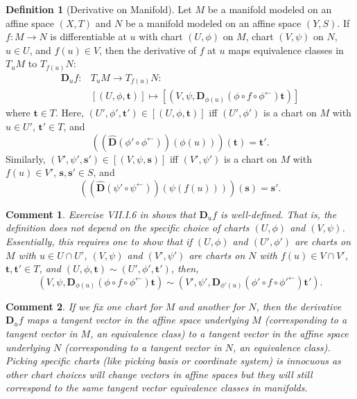 \documentclass[letterpaper,12pt]{article}
\theoremstyle{plain}
\theoremstyle{plain}
\newtheorem*{cmnt*}{Comment}
\theoremstyle{definition}
\newtheorem{defn}{Definition}
\begin{document}
\begin{defn}[Derivative on Manifold]\label{defmderiv}
Let $M$ be a manifold  modeled on an affine space $(X,T)$ and $N$ be a manifold  modeled on an affine space $(Y,S)$. If $f:M\rightarrow N$ is differentiable at $u$ with chart $(U,\phi)$ on $M$, chart $(V,\psi)$ on $N$, $u\in U$, and $f(u)\in V$, then the derivative of $f$ at $u$ maps equivalence classes in $T_uM$ to $T_{f(u)}N$:
\begin{align*}
\mathbf{D}_uf:&T_uM\rightarrow T_{f(u)}N:\\
&[(U,\phi,\mathbf{t})]\mapsto [\left(V,\psi,\mathbf{D}_{\phi(u)}\left(\phi\circ f \circ \phi^{\leftarrow}\right)\mathbf{t}\right)]
\end{align*}
where $\mathbf{t}\in T$. Here, $(U',\phi',\mathbf{t}')\in[(U,\phi,\mathbf{t})]$ iff $(U',\phi')$ is a chart on $M$ with $u\in U'$, $\mathbf{t}'\in T$,  and
\[ \left(\left(\hat{\mathbf{D}}\left(\phi' \circ \phi^{\leftarrow}\right)\right)\left(\phi(u)\right)\right)(\mathbf{t}) = \mathbf{t}'. \]
Similarly, $(V',\psi',\mathbf{s}')\in[(V,\psi,\mathbf{s})]$ iff $(V',\psi')$ is a chart on $M$ with $f(u)\in V'$, $\mathbf{s},\mathbf{s}'\in S$, and
\[ \left(\left(\hat{\mathbf{D}}\left(\psi' \circ \psi^{\leftarrow}\right)\right)\left(\psi(f(u))\right)\right)(\mathbf{s}) = \mathbf{s}'. \]
\end{defn}

\begin{cmnt*}
Exercise VII.I.6 in \citep{Dodson/Poston:1991} shows that $\mathbf{D}_uf$ is well-defined. That is, the definition does not depend on the specific choice of charts $(U,\phi)$ and $(V,\psi)$. Essentially, this requires one to show that if $(U,\phi)$ and $(U',\phi')$ are charts on $M$ with $u\in U\cap U'$, $(V,\psi)$ and $(V',\psi')$ are charts on $N$ with $f(u)\in V\cap V'$, $\mathbf{t},\mathbf{t}'\in T$, and $(U,\phi,\mathbf{t})\sim(U',\phi',\mathbf{t}')$, then,
\[ \left(V,\psi,\mathbf{D}_{\phi(u)}\left(\phi\circ f \circ \phi^{\leftarrow}\right)\mathbf{t}\right) \sim \left(V',\psi',\mathbf{D}_{\phi'(u)}\left(\phi'\circ f \circ \phi'^{\leftarrow}\right)\mathbf{t'}\right).\]
\end{cmnt*}

\begin{cmnt*}
If we fix one chart for $M$ and another for $N$, then the derivative $\mathbf{D}_uf$ maps a tangent vector in the affine space underlying $M$ (corresponding to a tangent vector in $M$, an equivalence class) to a tangent vector in the affine space underlying $N$ (corresponding to a tangent vector in $N$, an equivalence class). Picking specific charts (like picking basis or coordinate system) is innocuous as other chart choices will change vectors in affine spaces but they will still correspond to the same tangent vector equivalence classes in manifolds.
\end{cmnt*}
\end{document}
